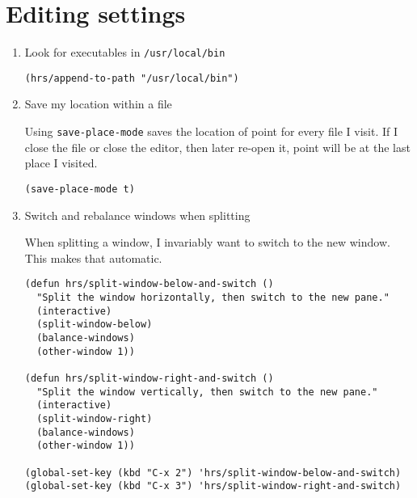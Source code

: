 \documentclass{article}
\begin{document}
\section{Editing settings}
\label{sec:orgcf74d3f}



\begin{enumerate}
\item Look for executables in \texttt{/usr/local/bin}
\label{sec:orgc378ebe}

\begin{verbatim}
(hrs/append-to-path "/usr/local/bin")
\end{verbatim}

\item Save my location within a file
\label{sec:org85e3537}

Using \texttt{save-place-mode} saves the location of point for every file I visit. If I
close the file or close the editor, then later re-open it, point will be at the
last place I visited.

\begin{verbatim}
(save-place-mode t)
\end{verbatim}






\item Switch and rebalance windows when splitting
\label{sec:org468f173}

When splitting a window, I invariably want to switch to the new window. This
makes that automatic.

\begin{verbatim}
(defun hrs/split-window-below-and-switch ()
  "Split the window horizontally, then switch to the new pane."
  (interactive)
  (split-window-below)
  (balance-windows)
  (other-window 1))

(defun hrs/split-window-right-and-switch ()
  "Split the window vertically, then switch to the new pane."
  (interactive)
  (split-window-right)
  (balance-windows)
  (other-window 1))

(global-set-key (kbd "C-x 2") 'hrs/split-window-below-and-switch)
(global-set-key (kbd "C-x 3") 'hrs/split-window-right-and-switch)
\end{verbatim}
\end{enumerate}
\end{document}
